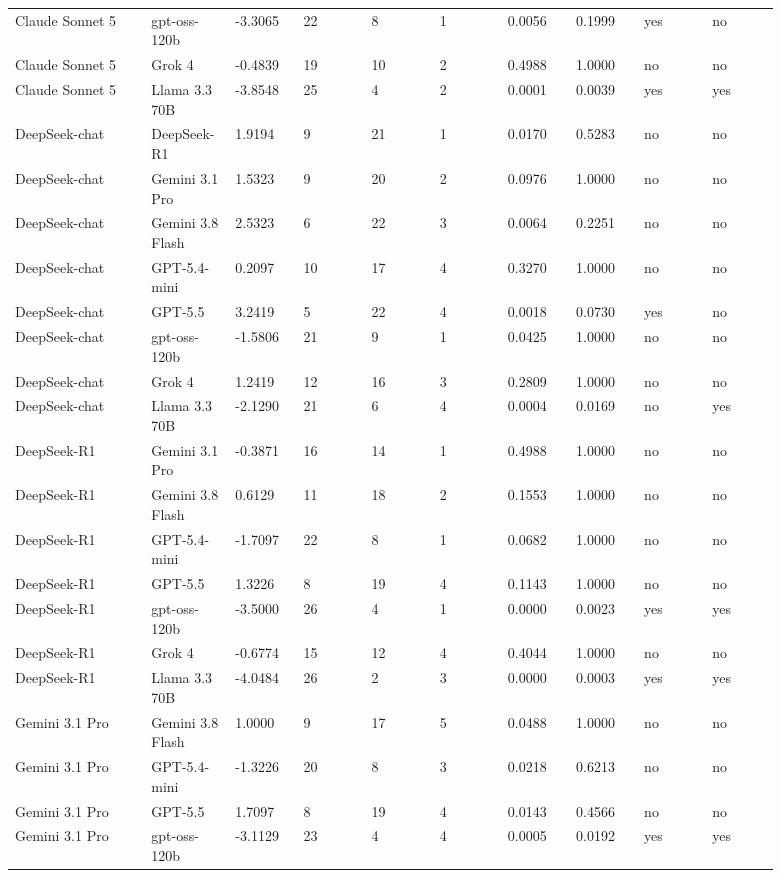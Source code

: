 \begin{landscape}
\begin{longtable}{p{0.162\linewidth}p{0.081\linewidth}p{0.081\linewidth}p{0.081\linewidth}p{0.081\linewidth}p{0.081\linewidth}p{0.081\linewidth}p{0.081\linewidth}p{0.081\linewidth}p{0.081\linewidth}}
Claude Sonnet 5 & gpt-oss-120b & -3.3065 & 22 & 8 & 1 & 0.0056 & 0.1999 & yes & no \\
Claude Sonnet 5 & Grok 4 & -0.4839 & 19 & 10 & 2 & 0.4988 & 1.0000 & no & no \\
Claude Sonnet 5 & Llama 3.3 70B & -3.8548 & 25 & 4 & 2 & 0.0001 & 0.0039 & yes & yes \\
DeepSeek-chat & DeepSeek-R1 & 1.9194 & 9 & 21 & 1 & 0.0170 & 0.5283 & no & no \\
DeepSeek-chat & Gemini 3.1 Pro & 1.5323 & 9 & 20 & 2 & 0.0976 & 1.0000 & no & no \\
DeepSeek-chat & Gemini 3.8 Flash & 2.5323 & 6 & 22 & 3 & 0.0064 & 0.2251 & no & no \\
DeepSeek-chat & GPT-5.4-mini & 0.2097 & 10 & 17 & 4 & 0.3270 & 1.0000 & no & no \\
DeepSeek-chat & GPT-5.5 & 3.2419 & 5 & 22 & 4 & 0.0018 & 0.0730 & yes & no \\
DeepSeek-chat & gpt-oss-120b & -1.5806 & 21 & 9 & 1 & 0.0425 & 1.0000 & no & no \\
DeepSeek-chat & Grok 4 & 1.2419 & 12 & 16 & 3 & 0.2809 & 1.0000 & no & no \\
DeepSeek-chat & Llama 3.3 70B & -2.1290 & 21 & 6 & 4 & 0.0004 & 0.0169 & no & yes \\
DeepSeek-R1 & Gemini 3.1 Pro & -0.3871 & 16 & 14 & 1 & 0.4988 & 1.0000 & no & no \\
DeepSeek-R1 & Gemini 3.8 Flash & 0.6129 & 11 & 18 & 2 & 0.1553 & 1.0000 & no & no \\
DeepSeek-R1 & GPT-5.4-mini & -1.7097 & 22 & 8 & 1 & 0.0682 & 1.0000 & no & no \\
DeepSeek-R1 & GPT-5.5 & 1.3226 & 8 & 19 & 4 & 0.1143 & 1.0000 & no & no \\
DeepSeek-R1 & gpt-oss-120b & -3.5000 & 26 & 4 & 1 & 0.0000 & 0.0023 & yes & yes \\
DeepSeek-R1 & Grok 4 & -0.6774 & 15 & 12 & 4 & 0.4044 & 1.0000 & no & no \\
DeepSeek-R1 & Llama 3.3 70B & -4.0484 & 26 & 2 & 3 & 0.0000 & 0.0003 & yes & yes \\
Gemini 3.1 Pro & Gemini 3.8 Flash & 1.0000 & 9 & 17 & 5 & 0.0488 & 1.0000 & no & no \\
Gemini 3.1 Pro & GPT-5.4-mini & -1.3226 & 20 & 8 & 3 & 0.0218 & 0.6213 & no & no \\
Gemini 3.1 Pro & GPT-5.5 & 1.7097 & 8 & 19 & 4 & 0.0143 & 0.4566 & no & no \\
Gemini 3.1 Pro & gpt-oss-120b & -3.1129 & 23 & 4 & 4 & 0.0005 & 0.0192 & yes & yes \\

\end{longtable}
\end{landscape}
